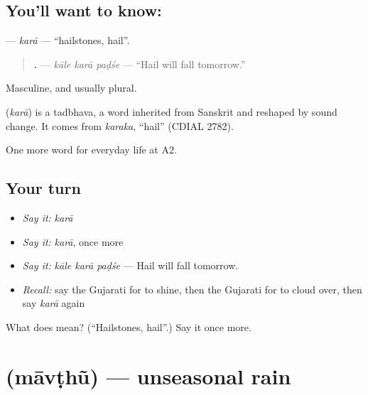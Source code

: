 \subsection*{You'll want to know: }
\textbf{} — \emph{karā} — \textquotedblleft{}hailstones, hail\textquotedblright{}.

\begin{quote}
\textbf{  .} — \emph{kāle karā paḍśe} — \textquotedblleft{}Hail will fall tomorrow.\textquotedblright{}
\end{quote}

Masculine, and usually plural.

\begin{cousinweb}
\textbf{} (\emph{karā}) is a tadbhava, a word inherited from Sanskrit and reshaped by sound change. It comes from \emph{karaka}, \textquotedblleft{}hail\textquotedblright{} (CDIAL 2782).
\end{cousinweb}

\begin{grammarlens}[title={What you've built}]
One more word for everyday life at A2.
\end{grammarlens}

\subsection*{Your turn}
\begin{itemize}
\raggedright
  \item \emph{Say it:} \emph{karā}
  \item \emph{Say it:} \emph{karā}, once more
  \item \emph{Say it:} \emph{kāle karā paḍśe} — Hail will fall tomorrow.
  \item \emph{Recall:} say the Gujarati for to shine, then the Gujarati for to cloud over, then say \emph{karā} again
\end{itemize}

\begin{tcolorbox}[breakable,colback=teal!4,colframe=teal!35!black,title={Before you move on}]
What does  mean? (\textquotedblleft{}Hailstones, hail\textquotedblright{}.) Say it once more.
\end{tcolorbox}
\section[\texorpdfstring{\gu{માવઠું} (māvṭhũ)}{માવઠું (māvṭhũ)}]{ (māvṭhũ) — unseasonal rain}

